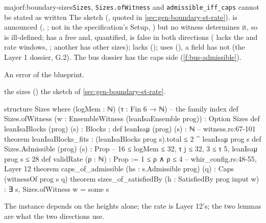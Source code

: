 \begin{finding}{major}{f:boundary-sizes}{\texttt{Sizes}, \texttt{Sizes.ofWitness} and \texttt{admissible\_iff\_caps} cannot be stated as written}
 The sketch (, quoted in \cref{sec:gen-boundary-st-rate}).
 is announced (, ; not in the
specification's Setup, ) but no witness determines it, so
 is ill-defined;
 has a free
 and, quantified, is false in both directions ( lacks the  and rate
windows, ; another  has other sizes);
 lacks  ();
 uses  (), a field  has not
(the Layer 1 dossier,  G.2). The bus dossier has the caps side
(\cref{f:bus-admissible}).

 An error of the blueprint.

\begin{change}{the sizes ()}
\asis the sketch of \cref{sec:gen-boundary-st-rate}.
\asproposed
\begin{leancode}
structure Sizes where (logMem : ℕ) (τ : Fin 6 → ℕ)                 -- the family index
def Sizes.ofWitness (w : EnsembleWitness (leanIsaEnsemble prog)) : Option Sizes
def leanIsaBlocks (prog) (s) : Blocks ; def leanIsaμ (prog) (s) : ℕ  -- witness.rs:67-101
theorem leanIsaBlocks_fits : (leanIsaBlocks prog s).total ≤ 2 ^ leanIsaμ prog s
def Sizes.Admissible (prog) (s) : Prop  -- 16 ≤ logMem ≤ 32, τ j ≤ 32, 3 ≤ τ 5, leanIsaμ prog s ≤ 28
def validRate (ρ : ℕ) : Prop := 1 ≤ ρ ∧ ρ ≤ 4                        -- whir_config.rs:48-55, Layer 12
theorem caps_of_admissible (hs : s.Admissible prog) (q) : Caps (witnessOf prog s q)
theorem sizes_of_satisfiedBy (h : SatisfiedBy prog input w) : ∃ s, Sizes.ofWitness w = some s
\end{leancode}
\reason The instance depends on the heights alone; the rate is Layer 12's; the two lemmas are what
the two directions use.
\end{change}
\end{finding}

